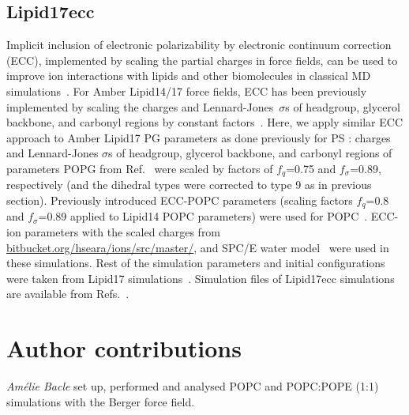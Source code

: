 \documentclass[journal=jpcbfk]{achemso}
\begin{document}
\subsection{Lipid17ecc}
Implicit inclusion of electronic polarizability by electronic continuum correction (ECC),
implemented by scaling the partial charges in force fields, can be used to improve ion interactions with lipids
and other biomolecules in classical MD simulations~\cite{dijon20}.
For Amber Lipid14/17 force fields, ECC has been previously implemented by scaling the
charges and Lennard-Jones~$\sigma$s of headgroup, glycerol backbone, and carbonyl regions
by constant factors~\cite{melcr18,melcr20}.
Here, we apply similar ECC approach to Amber Lipid17 PG parameters as done previously for PS \cite{melcr20}:
charges and Lennard-Jones $\sigma$s of headgroup, glycerol backbone, and carbonyl regions
of parameters POPG from Ref.~ were scaled by factors of $f_q$=0.75 and $f_\sigma$=0.89, respectively
(and the dihedral types were corrected to type 9 as in previous section).
Previously introduced ECC-POPC parameters (scaling factors $f_q$=0.8 and $f_\sigma$=0.89 applied to Lipid14 POPC parameters)
were used for POPC~\cite{melcr18}.
ECC-ion parameters with the scaled charges \cite{pluharova14,kohagen16,martinek18}
from \url{bitbucket.org/hseara/ions/src/master/}, and SPC/E water model~\cite{berendsen87} were used in these simulations. 
Rest of the simulation parameters and initial configurations were taken from Lipid17
simulations~\cite{Lipid17POPCPOPG8020,Lipid17POPCPOPG8020100mMCaCl,Lipid17POPCPOPG80201000mMCaCl,Lipid17POPCPOPG5050,Lipid17POPCPOPG5050100mMCaCl,Lipid17POPCPOPG50501000mMCaCl}.
Simulation files of Lipid17ecc simulations are available from
Refs.~.




\clearpage

\section{Author contributions}
\noindent
{\it Am{\'e}lie Bacle} set up, performed and analysed POPC and POPC:POPE (1:1) simulations with the Berger force field.
\end{document}
